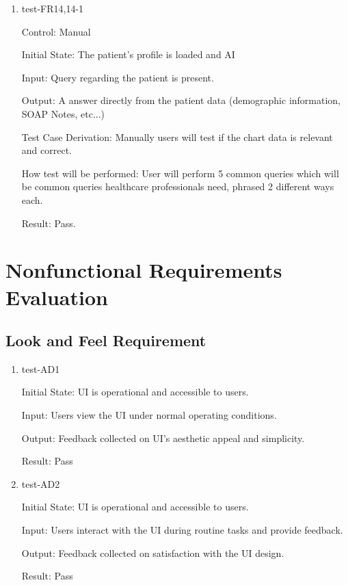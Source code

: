\documentclass[12pt, titlepage]{article}
\begin{document}
\begin{enumerate}

\item{test-FR14,14-1} \label{test-FR14-1}

Control: Manual

Initial State: The patient's profile is loaded and AI 

Input: Query regarding the patient is present.

Output: A answer directly from the patient data (demographic information, SOAP Notes, etc...)

Test Case Derivation: Manually users will test if the chart data is relevant and correct.  

How test will be performed: User will perform 5 common queries which will be common queries healthcare professionals need, phrased 2 different ways each.

Result: Pass.
\end{enumerate}


\section{Nonfunctional Requirements Evaluation} \label{section:4}

\subsection{Look and Feel Requirement} \label{section:4.1}

\begin{enumerate}

  \item {test-AD1} \label{test-AD1}

  Initial State: UI is operational and accessible to users.

  Input: Users view the UI under normal operating conditions.

  Output: Feedback collected on UI's aesthetic appeal and simplicity.

  Result: Pass

  \item {test-AD2} \label{test-AD2}

  Initial State: UI is operational and accessible to users.

  Input: Users interact with the UI during routine tasks and provide feedback.

  Output: Feedback collected on satisfaction with the UI design.

  Result: Pass

\end{enumerate}
\end{document}
